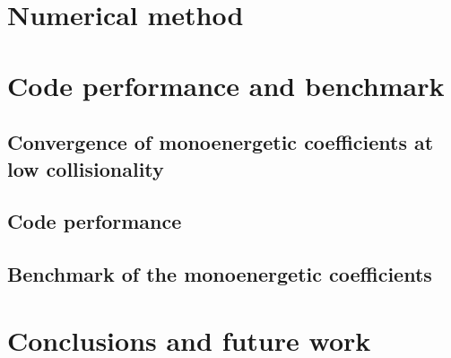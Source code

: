 \documentclass[10pt]{iopart}
\begin{document}
\section{Numerical method}
\label{sec:Algorithm}

%
\section{Code performance and benchmark}
\label{sec:Results_Benchmark}





\subsection{Convergence of monoenergetic coefficients at low collisionality}
\label{subsec:Convergence}


\subsection{Code performance}\label{subsec:Performance}

\FloatBarrier

\subsection{Benchmark of the monoenergetic coefficients}\label{subsec:Benchmark}



\section{Conclusions and future work}
\label{sec:Conclusions}

 

\FloatBarrier
\appendix



	

%
	
\FloatBarrier
\end{document}
